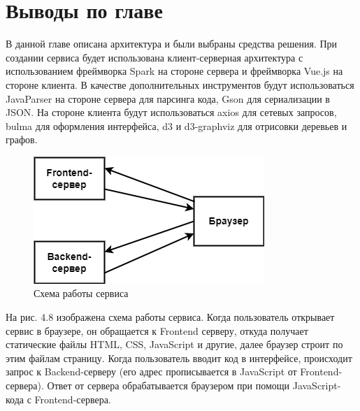 \section{Выводы по главе} \label{ch4:sec6}
В данной главе описана архитектура и были выбраны средства решения. При создании сервиса будет использована клиент-серверная архитектура с использованием фреймворка Spark на стороне сервера и фреймворка Vue.js на стороне клиента. В качестве дополнительных инструментов будут использоваться JavaParser на стороне сервера для парсинга кода, Gson для сериализации в JSON. На стороне клиента будут использоваться axios для сетевых запросов, bulma для оформления интерфейса, d3 и d3-graphviz для отрисовки деревьев и графов.
\begin{figure}[h]
	\center
	\includegraphics [scale=0.68] {my_folder/images/my/19}
	\caption{Схема работы сервиса} 
	\label{fig:19}  
\end{figure}
\newpage
На рис. 4.8 изображена схема работы сервиса. Когда пользователь открывает сервис в браузере, он обращается к Frontend серверу, откуда получает статические файлы HTML, CSS, JavaScript и другие, далее браузер строит по этим файлам страницу. Когда пользователь вводит код в интерфейсе, происходит запрос к Backend-серверу (его адрес прописывается в JavaScript от Frontend-сервера). Ответ от сервера обрабатывается браузером при помощи JavaScript-кода с Frontend-сервера.
\newpage